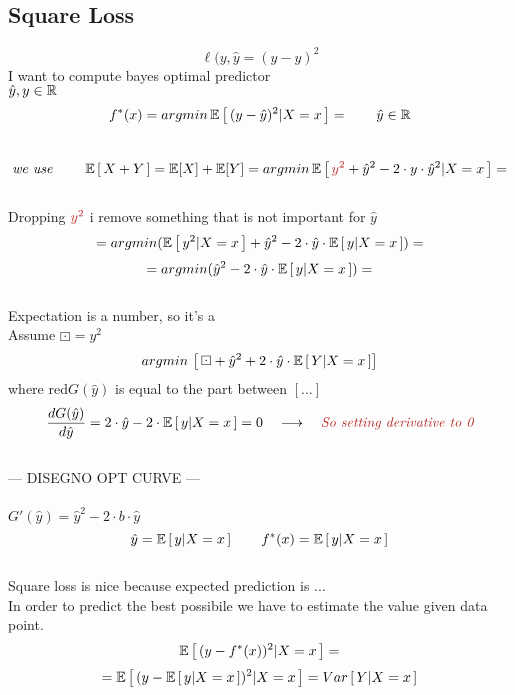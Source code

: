 \documentclass[../main.tex]{subfiles}
\begin{document}
\subsection{Square Loss}
$$\ell(y,\hat{y} = (y - \hat{y})^2$$
I want to compute bayes optimal predictor\\
$\hat{y}, y \in \mathbb{R}$
\\
$$
f^*(x) = argmin \, \mathbb{E} \left[ \, (y-\hat{y})^2 | X = x \, \right] = \qquad \hat{y} \in \mathbb{R}
$$\
$$
\textit{we use }\qquad \barra{E}\left[\,X+Y\,\right] = \barra{E}[X] + \barra{E}[Y] = argmin \, \barra{E}\left[\,\red{y^2} + \hat{y}^2- 2\cdot y \cdot \hat{y}^2 | X = x \, \right] = 
$$
\\
Dropping $\red{y^2}$ i remove something that is not important for $\hat{y}$
\\
$$
= argmin ( \mathbb{E} \left[\, y^2 | X = x\, \right] + \hat{y}^2 - 2 \cdot \hat{y} \cdot \mathbb{E} \left[ \, y | X = x \, \right] ) = 
$$
$$
= argmin (\hat{y}^2 - 2 \cdot \hat{y} \cdot \mathbb{E} \left[ \, y | X = x \, \right] ) =
$$
\\ Expectation is a number, so it's a 
\\
Assume $ \boxdot = y^2 $
$$
argmin \, \left[\, \boxdot + \hat{y}^2 + 2 \cdot \hat{y} \cdot \mathbb{E} \left[\, Y|X =x\,\right] \right]
$$
where red{$G(\hat{y})$ is equal to the part between $\left[...\right]$}
$$
\frac{d G(\hat{y})}{d\hat{y}} = 2 \cdot \hat{y}- 2 \cdot \barra{E} \left[ \, y | X= x \, \right] = 0  \quad \longrightarrow \quad \red{\textit{So setting derivative to 0}}
$$
\\ --- DISEGNO OPT CURVE ---\\\\
$G' (\hat{y}) = \hat{y}^2 - 2\cdot b \cdot \hat{y}$
\\
$$
\hat{y} = \mathbb{E} \left[ \, y| X= x \, \right] \qquad f^*(x) = \mathbb{E} \left[ \, y | X = x \, \right]
$$
\\
Square loss is nice because expected prediction is ...\\
In order to predict the best possibile we have to estimate the value given data
point.
\\
$$ 
\mathbb{E} \left[ \, (y- f^*(x))^2 | X = x \, \right] = 
$$
$$
= \mathbb{E} \left[ \, (y- \mathbb{E} \left[ \, y | X = x \,\right] )^2 | X = x \, \right] = Var \left[ \, Y | X = x \, \right]
$$
\\
\end{document}
